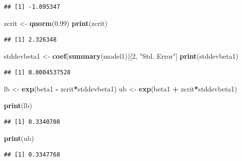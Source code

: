 \documentclass[
]{article}
\newenvironment{Shaded}{\begin{snugshade}}{\end{snugshade}}
\newcommand{\DecValTok}[1]{\textcolor[rgb]{0.00,0.00,0.81}{#1}}
\newcommand{\FloatTok}[1]{\textcolor[rgb]{0.00,0.00,0.81}{#1}}
\newcommand{\FunctionTok}[1]{\textcolor[rgb]{0.13,0.29,0.53}{\textbf{#1}}}
\newcommand{\NormalTok}[1]{#1}
\newcommand{\OtherTok}[1]{\textcolor[rgb]{0.56,0.35,0.01}{#1}}
\newcommand{\SpecialCharTok}[1]{\textcolor[rgb]{0.81,0.36,0.00}{\textbf{#1}}}
\newcommand{\StringTok}[1]{\textcolor[rgb]{0.31,0.60,0.02}{#1}}
\begin{document}
\begin{verbatim}
## [1] -1.095347
\end{verbatim}

\begin{Shaded}
\begin{Highlighting}[]
\NormalTok{zcrit }\OtherTok{\textless{}{-}} \FunctionTok{qnorm}\NormalTok{(}\FloatTok{0.99}\NormalTok{)}
\FunctionTok{print}\NormalTok{(zcrit)}
\end{Highlighting}
\end{Shaded}

\begin{verbatim}
## [1] 2.326348
\end{verbatim}

\begin{Shaded}
\begin{Highlighting}[]
\NormalTok{stddevbeta1 }\OtherTok{\textless{}{-}} \FunctionTok{coef}\NormalTok{(}\FunctionTok{summary}\NormalTok{(model1))[}\DecValTok{2}\NormalTok{, }\StringTok{"Std. Error"}\NormalTok{]}
\FunctionTok{print}\NormalTok{(stddevbeta1)}
\end{Highlighting}
\end{Shaded}

\begin{verbatim}
## [1] 0.0004537528
\end{verbatim}

\begin{Shaded}
\begin{Highlighting}[]
\NormalTok{lb }\OtherTok{\textless{}{-}} \FunctionTok{exp}\NormalTok{(beta1 }\SpecialCharTok{{-}}\NormalTok{ zcrit}\SpecialCharTok{*}\NormalTok{stddevbeta1)}
\NormalTok{ub }\OtherTok{\textless{}{-}} \FunctionTok{exp}\NormalTok{(beta1 }\SpecialCharTok{+}\NormalTok{ zcrit}\SpecialCharTok{*}\NormalTok{stddevbeta1)}

\FunctionTok{print}\NormalTok{(lb)}
\end{Highlighting}
\end{Shaded}

\begin{verbatim}
## [1] 0.3340708
\end{verbatim}

\begin{Shaded}
\begin{Highlighting}[]
\FunctionTok{print}\NormalTok{(ub)}
\end{Highlighting}
\end{Shaded}

\begin{verbatim}
## [1] 0.3347768
\end{verbatim}
\end{document}
